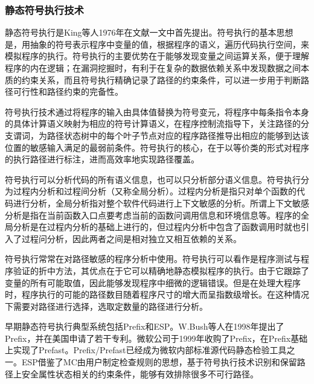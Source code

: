 %

\subsubsection{静态符号执行技术}

静态符号执行是King等人1976年在文献一文中首先提出。符号执行的基本思想是，用抽象的符号表示程序中变量的值，根据程序的语义，遍历代码执行空间，来模拟程序的执行。符号执行的主要优势在于能够发现变量之间运算关系，便于理解程序的内在逻辑；在漏洞挖掘时，有利于在复杂的数据依赖关系中发现数据之间本质的约束关系，而且符号执行精确记录了路径的约束条件，可以进一步用于判断路径可行性和路径约束的完备性。

符号执行技术通过将程序的输入由具体值替换为符号变元，将程序中每条指令本身的具体计算语义映射为相应的符号计算语义，在程序控制流指导下，关注路径的分支谓词，为路径状态树中的每个叶子节点对应的程序路径推导出相应的能够到达该位置的敏感输入满足的最弱前条件。符号执行的核心，在于以等价类的形式对程序的执行路径进行标注，进而高效率地实现路径覆盖。

符号执行可以分析代码的所有语义信息，也可以只分析部分语义信息。符号执行分为过程内分析和过程间分析（又称全局分析）。过程内分析是指只对单个函数的代码进行分析，全局分析指对整个软件代码进行上下文敏感的分析。所谓上下文敏感分析是指在当前函数入口点要考虑当前的函数问调用信息和环境信息等。程序的全局分析是在过程内分析的基础上进行的，但过程内分析中包含了函数调用时就也引入了过程问分析，因此两者之间是相对独立又相互依赖的关系。

符号执行常常在对路径敏感的程序分析中使用。符号执行可以看作是程序测试与程序验证的折中方法，其优点在于它可以精确地静态模拟程序的执行。由于它跟踪了变量的所有可能取值，因此能够发现程序中细微的逻辑错误。但是在处理大程序时，程序执行的可能的路径数目随着程序尺寸的增大而呈指数级增长。在这种情况下需要对路径进行选择，选取定数量的路径进行分析。

早期静态符号执行典型系统包括Prefix和ESP。W.Bush等人在1998年提出了Prefix，并在美国申请了若干专利。微软公司于1999年收购了Prefix，在Prefix基础上实现了Prefast。Prefix/Prefast已经成为微软内部标准源代码静态检验工具之一。ESP借鉴了MC由用户制定检查规则的思想，基于符号执行技术识别和保留路径上安全属性状态相关的约束条件，能够有效排除很多不可行路径。

